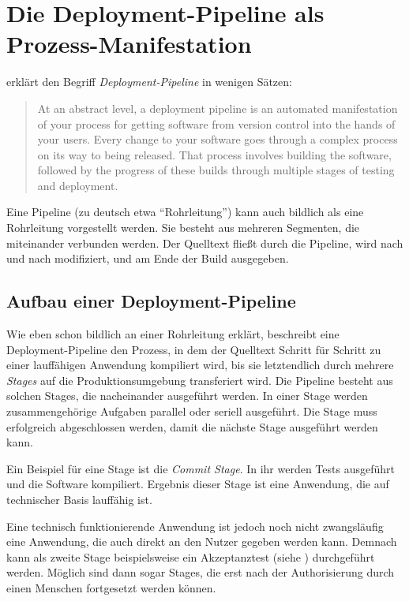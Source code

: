 \section{Die Deployment-Pipeline als Prozess-Manifestation}
\label{sec:deployment-pipeline}

\citet[106]{Humble2010} erklärt den Begriff \emph{Deployment-Pipeline} in wenigen Sätzen:

\begin{quote}
 At an abstract level, a deployment pipeline is an automated manifestation of your process for getting software from version control into the hands of your users. Every change to your software goes through a complex process on its way to being released. That process involves building the software, followed by the progress of these builds through multiple stages of testing and deployment.
\end{quote}

Eine Pipeline (zu deutsch etwa ``Rohrleitung'') kann auch bildlich als eine Rohrleitung vorgestellt werden. Sie besteht aus mehreren Segmenten, die miteinander verbunden werden. Der Quelltext fließt durch die Pipeline, wird nach und nach modifiziert, und am Ende der Build ausgegeben.

\subsection{Aufbau einer Deployment-Pipeline}

Wie eben schon bildlich an einer Rohrleitung erklärt, beschreibt eine Deployment-Pipeline den Prozess, in dem der Quelltext Schritt für Schritt zu einer lauffähigen Anwendung kompiliert wird, bis sie letztendlich durch mehrere \emph{Stages} auf die Produktionsumgebung transferiert wird. Die Pipeline besteht aus solchen Stages, die nacheinander ausgeführt werden. In einer Stage werden zusammengehörige Aufgaben parallel oder seriell ausgeführt. Die Stage muss erfolgreich abgeschlossen werden, damit die nächste Stage ausgeführt werden kann.

Ein Beispiel für eine Stage ist die \emph{Commit Stage}. In ihr werden Tests ausgeführt und die Software kompiliert. Ergebnis dieser Stage ist eine Anwendung, die auf technischer Basis lauffähig ist. \citep[110]{Humble2010}

Eine technisch funktionierende Anwendung ist jedoch noch nicht zwangsläufig eine Anwendung, die auch direkt an den Nutzer gegeben werden kann. Demnach kann als zweite Stage beispielsweise ein Akzeptanztest (siehe ) durchgeführt werden. Möglich sind dann sogar Stages, die erst nach der Authorisierung durch einen Menschen fortgesetzt werden können. \citep{FowlerDP}

